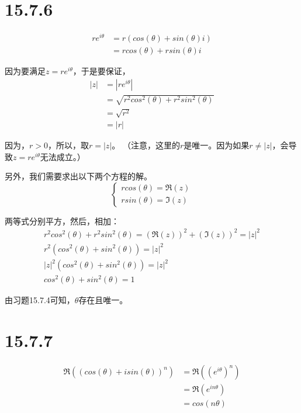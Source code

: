 \documentclass{article}
\begin{document}
\section*{15.7.6}

\begin{align*}
  re^{i\theta} & = r(cos(\theta) + sin(\theta)i) \\
               & = rcos(\theta) + rsin(\theta)i
\end{align*}

因为要满足$z = re^{i\theta}$，于是要保证，
\begin{align*}
  |z| & = |re^{i\theta}|                             \\
      & = \sqrt{r^2cos^2(\theta) + r^2sin^2(\theta)} \\
      & = \sqrt{r^2}                                 \\
      & = |r|
\end{align*}

因为，$r > 0$，所以，取$r = |z|$。
（注意，这里的$r$是唯一。因为如果$r \neq |z|$，会导致$z = re^{i\theta}$无法成立。）

另外，我们需要求出以下两个方程的解。
\begin{equation*}
  \begin{cases*}
    rcos(\theta) = \mathfrak{R}(z) \\
    rsin(\theta) = \mathfrak{I}(z)
  \end{cases*}
\end{equation*}

两等式分别平方，然后，相加：
\begin{align*}
  r^2cos^2(\theta) + r^2sin^2(\theta) = (\mathfrak{R}(z))^2 + (\mathfrak{I}(z))^2 = |z|^2 \\
  r^2(cos^2(\theta) + sin^2(\theta)) = |z|^2                                              \\
  |z|^2(cos^2(\theta) + sin^2(\theta)) = |z|^2                                            \\
  cos^2(\theta) + sin^2(\theta) = 1
\end{align*}

由习题15.7.4可知，$\theta$存在且唯一。

\section*{15.7.7}

\begin{align*}
  \mathfrak{R}((cos(\theta) + isin(\theta))^n) & = \mathfrak{R}((e^{i\theta})^n) \\
                                               & = \mathfrak{R}(e^{in\theta})    \\
                                               & = cos(n\theta)
\end{align*}
\end{document}
